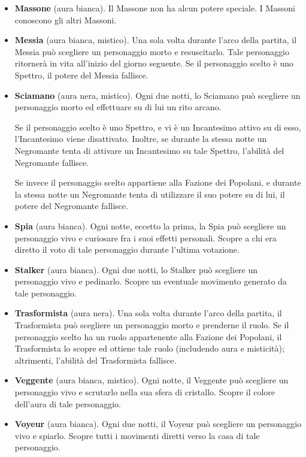 \documentclass[a4paper,10pt]{article}
\begin{document}
\begin{itemize}
	\item {\bf Massone} (aura bianca). Il Massone non ha alcun potere speciale. I Massoni conoscono gli altri Massoni.
 
	\item {\bf Messia} (aura bianca, mistico). Una sola volta durante l'arco della partita, il Messia può scegliere un personaggio morto e resuscitarlo. Tale personaggio ritornerà in vita all'inizio del giorno seguente. Se il personaggio scelto è uno Spettro, il potere del Messia fallisce.

	\item{\bf Sciamano} (aura nera, mistico). Ogni due notti, lo Sciamano può scegliere un personaggio morto ed effettuare su di lui un rito arcano.
	
	Se il personaggio scelto è uno Spettro, e vi è un Incantesimo attivo su di esso, l'Incantesimo viene disattivato. Inoltre, se durante la stessa notte un Negromante tenta di attivare un Incantesimo su tale Spettro, l'abilità del Negromante fallisce.
	
	Se invece il personaggio scelto appartiene alla Fazione dei Popolani, e durante la stessa notte un Negromante tenta di utilizzare il suo potere su di lui, il potere del Negromante fallisce.
	
	\item {\bf Spia} (aura bianca). Ogni notte, eccetto la prima, la Spia può scegliere un personaggio vivo e curiosare fra i suoi effetti personali. Scopre a chi era diretto il voto di tale personaggio durante l'ultima votazione.

	\item {\bf Stalker} (aura bianca). Ogni due notti, lo Stalker può scegliere un personaggio vivo e pedinarlo. Scopre un eventuale movimento generato da tale personaggio.
	
	\item {\bf Trasformista} (aura nera). Una sola volta durante l'arco della partita, il Trasformista può scegliere un personaggio morto e prenderne il ruolo. Se il personaggio scelto ha un ruolo appartenente alla Fazione dei Popolani, il Trasformista lo scopre ed ottiene tale ruolo (includendo aura e misticità); altrimenti, l'abilità del Trasformista fallisce.
	
	\item {\bf Veggente} (aura bianca, mistico). Ogni notte, il Veggente può scegliere un personaggio vivo e scrutarlo nella sua sfera di cristallo. Scopre il colore dell'aura di tale personaggio.

	\item {\bf Voyeur} (aura bianca). Ogni due notti, il Voyeur può scegliere un personaggio vivo e spiarlo. Scopre tutti i movimenti diretti verso la casa di tale personaggio.
	
\end{itemize}
\end{document}

